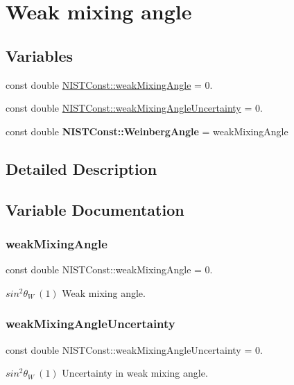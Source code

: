 \hypertarget{group___weak_mixing_angle}{}\section{Weak mixing angle}
\label{group___weak_mixing_angle}
\subsection*{Variables}
\begin{DoxyCompactItemize}
\item 
const double \hyperlink{group___weak_mixing_angle_gaf4037fe32df08c9c7eccd8487b5eab34}{N\+I\+S\+T\+Const\+::weak\+Mixing\+Angle} = 0.
\item 
const double \hyperlink{group___weak_mixing_angle_ga6b461a8ed9af6322050586b5919cda98}{N\+I\+S\+T\+Const\+::weak\+Mixing\+Angle\+Uncertainty} = 0.
\item 
\mbox{\label{group___weak_mixing_angle_gaa27d3628b9e064d9d8d998be81b6adf0}} 
const double {\bfseries N\+I\+S\+T\+Const\+::\+Weinberg\+Angle} = weak\+Mixing\+Angle
\end{DoxyCompactItemize}


\subsection{Detailed Description}


\subsection{Variable Documentation}
\mbox{\label{group___weak_mixing_angle_gaf4037fe32df08c9c7eccd8487b5eab34}} 
\subsubsection{\texorpdfstring{weak\+Mixing\+Angle}{weakMixingAngle}}
{\footnotesize\ttfamily const double N\+I\+S\+T\+Const\+::weak\+Mixing\+Angle = 0.}

$sin^2 \theta_W \ (1)$ Weak mixing angle. \mbox{\label{group___weak_mixing_angle_ga6b461a8ed9af6322050586b5919cda98}} 
\subsubsection{\texorpdfstring{weak\+Mixing\+Angle\+Uncertainty}{weakMixingAngleUncertainty}}
{\footnotesize\ttfamily const double N\+I\+S\+T\+Const\+::weak\+Mixing\+Angle\+Uncertainty = 0.}

$sin^2 \theta_W \ (1)$ Uncertainty in weak mixing angle. 